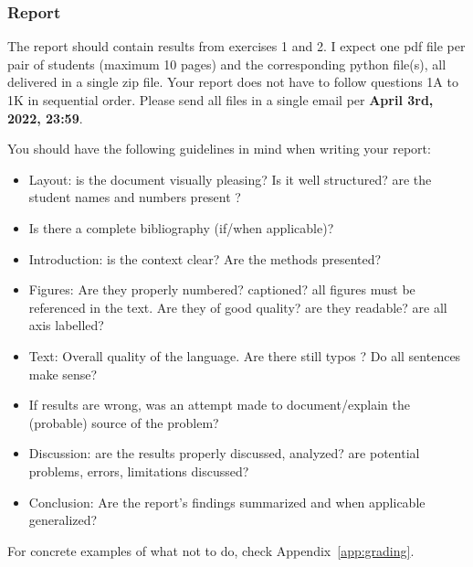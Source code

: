 \subsubsection*{Report}

The report should contain results from exercises 1 and 2. I expect one pdf file per pair of students
(maximum 10 pages) and the corresponding python file(s), all delivered in a single zip file.
Your report does not have to follow questions 1A to 1K in sequential order. 
Please send all files in a single email per {\bf April 3rd, 2022, 23:59}. 

You should have the following guidelines in mind when writing your report:
\begin{itemize}
\item Layout: is the document visually pleasing? Is it well structured? are the student names 
and numbers present ?
\item Is there a complete bibliography (if/when applicable)?
\item Introduction: is the context clear? Are the methods presented?
\item Figures: Are they properly numbered? captioned? all figures must be referenced in the text. 
Are they of good quality? are they readable? are all axis labelled?
\item Text: Overall quality of the language. Are there still typos ? Do all sentences make sense?
\item If results are wrong, was an attempt made to document/explain the (probable) source
of the problem?
\item Discussion: are the results properly discussed, analyzed? are potential problems, 
errors, limitations discussed?
\item Conclusion: Are the report's findings summarized and when applicable generalized?
\end{itemize}
For concrete examples of what not to do, check Appendix~\ref{app:grading}.



